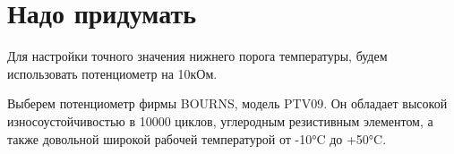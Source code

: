 \section {Надо придумать}

Для настройки точного значения нижнего порога температуры, будем использовать потенциометр на 10кОм.

Выберем потенциометр фирмы BOURNS, модель PTV09. Он обладает высокой износоустойчивостью в 10000 циклов, углеродным резистивным элементом, а также довольной широкой рабочей температурой от -10°C до +50°C. 